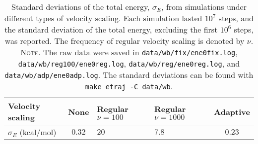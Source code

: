 \documentclass[reprint]{revtex4-1}
\newcommand{\note}[1]{{\color{DarkGreen}\footnotesize \textsc{Note.} #1}}
\begin{document}
\begin{table}[h]
  \setlength{\tabcolsep}{5pt}
  \renewcommand{\arraystretch}{1.5}
  \begin{center}
    \begin{tabular}{ p{2.5cm} | c p{1.3cm} p{1.3cm} c }
      \hline
      Velocity scaling
      &   None    &   Regular \newline $\nu =100 $   & Regular \newline $\nu = 1000$  &   Adaptive \\
      \hline
      $\sigma_E$ (kcal/mol)
      &   $0.32$  &   $20$    &  $7.8$     &   $0.23$ \\
      \hline
    \end{tabular}
  \end{center}
  \caption{
    \label{tab:etraj}
    Standard deviations of the total energy, $\sigma_E$,
    from simulations under different types of velocity scaling.
    Each simulation lasted $10^7$ steps,
    and the standard deviation of the total energy,
    excluding the first $10^6$ steps, was reported.
    The frequency of regular velocity scaling
    is denoted by $\nu$.
    \note{
      The raw data were saved in
      \texttt{data/wb/fix/ene0fix.log},
      \texttt{data/wb/reg100/ene0reg.log},
      \texttt{data/wb/reg/ene0reg.log},
      and
      \texttt{data/wb/adp/ene0adp.log}.
      The standard deviations can be found with
      \texttt{make etraj -C data/wb}.
    }%
  }
\end{table}

\end{document}
